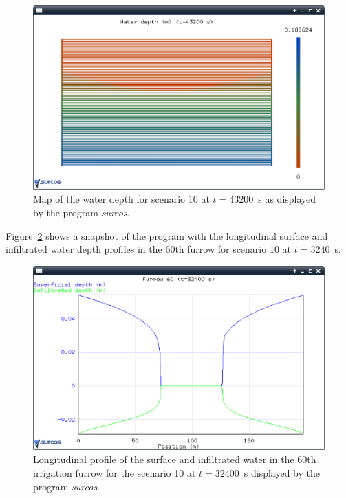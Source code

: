 \documentclass[review,authoryear]{elsarticle}
\begin{document}
\begin{figure}[!ht]
\begin{center}
\includegraphics[width=\textwidth]{evo1EN.eps}
\caption{Map of the water depth for scenario 10 at
$t=43200$~s as displayed by the program \emph{surcos}.}\label{evo1}
\end{center}
\end{figure}

Figure~\ref{evo2} shows a snapshot of the program with the longitudinal surface
and infiltrated water depth profiles in the 60th furrow for scenario 10 at
$t=3240$~s.

\begin{figure}[ht!]
\begin{center}
\includegraphics[width=\textwidth]{evoSurcoEN.eps}
\caption{Longitudinal profile of the surface and infiltrated
water in the 60th irrigation furrow for the scenario 10 at $t=32400$~s displayed by
the program \emph{surcos}.}\label{evo2}
\end{center}
\end{figure}
\end{document}
